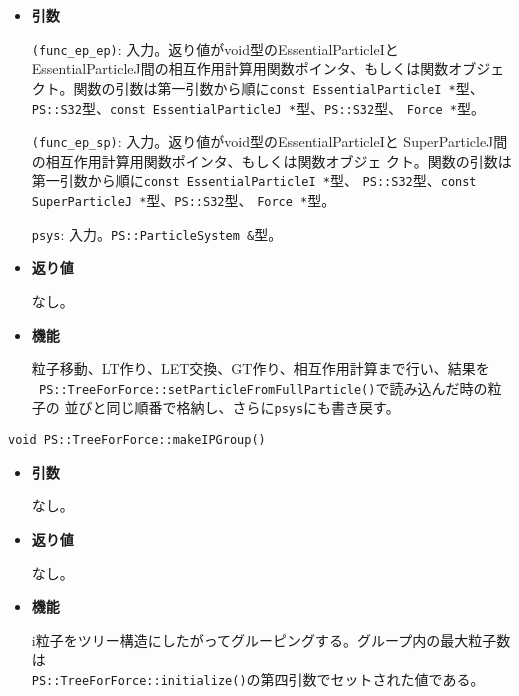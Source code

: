 \begin{itemize}

\item{{\bf 引数}}

{\tt (func\_ep\_ep)}: 入力。返り値がvoid型の{EssentialParticleI}と
{EssentialParticleJ}間の相互作用計算用関数ポインタ、もしくは関数オブジェ
クト。関数の引数は第一引数から順に{\tt const EssentialParticleI *}型、
{\tt PS::S32}型、{\tt const EssentialParticleJ *}型、{\tt PS::S32}型、
{\tt Force *}型。

{\tt (func\_ep\_sp)}: 入力。返り値がvoid型の{EssentialParticleI}と
{SuperParticleJ}間の相互作用計算用関数ポインタ、もしくは関数オブジェ
クト。関数の引数は第一引数から順に{\tt const EssentialParticleI *}型、
{\tt PS::S32}型、{\tt const SuperParticleJ *}型、{\tt PS::S32}型、
{\tt Force *}型。

{\tt psys}: 入力。{\tt PS::ParticleSystem \&}型。

\item{{\bf 返り値}}

なし。

\item{{\bf 機能}}

粒子移動、LT作り、LET交換、GT作り、相互作用計算まで行い、結果を\\ {\tt
PS::TreeForForce::setParticleFromFullParticle()}で読み込んだ時の粒子の
並びと同じ順番で格納し、さらに{\tt psys}にも書き戻す。

\end{itemize}



\begin{screen}
\begin{verbatim}
void PS::TreeForForce::makeIPGroup()
\end{verbatim}
\end{screen}
\begin{itemize}

\item{{\bf 引数}}

なし。

\item{{\bf 返り値}}

なし。

\item{{\bf 機能}}

i粒子をツリー構造にしたがってグルーピングする。グループ内の最大粒子数は
\\{\tt PS::TreeForForce::initialize()}の第四引数でセットされた値である。

\end{itemize}


